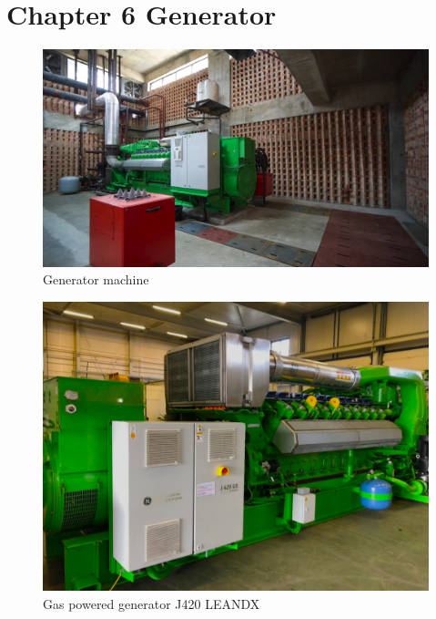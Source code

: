 \section{Chapter 6 Generator}
\begin{figure}[h!]
    \centering
    \includegraphics[width=1\linewidth]{figs/generator.jpg}
    \caption{Generator machine}
    \label{fig:generator}
\end{figure}

\begin{figure}
    \centering
    \includegraphics[width=1\linewidth]{figs/gas_gen_j420_leandx.png}
    \caption{Gas powered generator J420 LEANDX}
    \label{fig:gas_gen}
\end{figure}